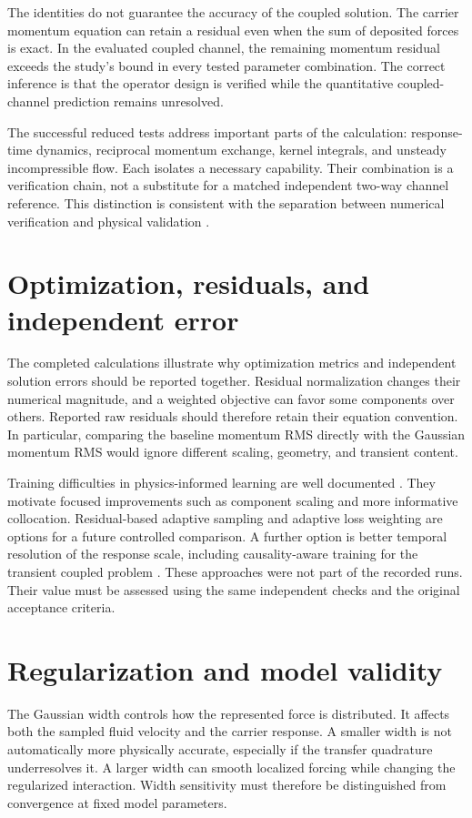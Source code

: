 The identities do not guarantee the accuracy of the coupled solution.
The carrier momentum equation can retain a residual even when the sum of
deposited forces is exact. In the evaluated coupled channel, the remaining
momentum residual exceeds the study's bound in every tested parameter
combination. The correct inference is that the operator design is verified
while the quantitative coupled-channel prediction remains unresolved.

The successful reduced tests address important parts of the calculation:
response-time dynamics, reciprocal momentum exchange, kernel integrals,
and unsteady incompressible flow. Each isolates a necessary capability.
Their combination is a verification chain, not a substitute for a matched
independent two-way channel reference. This distinction is consistent with
the separation between numerical verification and physical validation
\citep{roache1998}.

\section{Optimization, residuals, and independent error}
The completed calculations illustrate why optimization metrics and
independent solution errors should be reported together. Residual
normalization changes their numerical magnitude, and a weighted objective
can favor some components over others. Reported raw residuals should
therefore retain their equation convention. In particular, comparing the
baseline momentum RMS directly with the Gaussian momentum RMS would
ignore different scaling, geometry, and transient content.

Training difficulties in physics-informed learning are well documented
\citep{wang2021,wang2022,krishnapriyan2021}. They motivate focused improvements such as %
component scaling and more informative collocation. Residual-based
adaptive sampling \citep{wu2023} and adaptive loss weighting
\citep{mcclenny2023} are options for a future controlled comparison.
A further option is better temporal %
resolution of the response scale, including causality-aware training
for the transient coupled problem \citep{wang2024}. These approaches were
not part of the recorded runs. Their value must be assessed %
using the same independent checks and the original acceptance criteria.

\section{Regularization and model validity}
The Gaussian width controls how the represented force is distributed.
It affects both the sampled fluid velocity and the carrier response.
A smaller width is not automatically more physically accurate, especially
if the transfer quadrature underresolves it. A larger width can smooth
localized forcing while changing the regularized interaction. Width
sensitivity must therefore be distinguished from convergence at fixed
model parameters.

